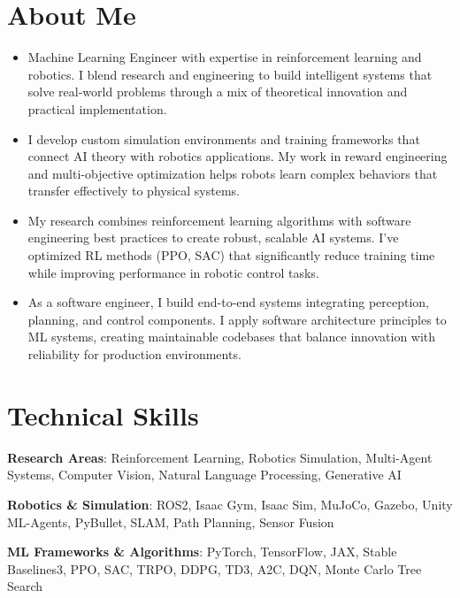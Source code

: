 \documentclass[a4paper,10pt]{article}
\begin{document}
\section{\textbf{About Me}}
\vspace{1mm}
\small{
\begin{itemize}
    \item Machine Learning Engineer with expertise in reinforcement learning and robotics. I blend research and engineering to build intelligent systems that solve real-world problems through a mix of theoretical innovation and practical implementation.
    
    \item I develop custom simulation environments and training frameworks that connect AI theory with robotics applications. My work in reward engineering and multi-objective optimization helps robots learn complex behaviors that transfer effectively to physical systems.
    
    \item My research combines reinforcement learning algorithms with software engineering best practices to create robust, scalable AI systems. I've optimized RL methods (PPO, SAC) that significantly reduce training time while improving performance in robotic control tasks.
    
    \item As a software engineer, I build end-to-end systems integrating perception, planning, and control components. I apply software architecture principles to ML systems, creating maintainable codebases that balance innovation with reliability for production environments.
\end{itemize}
}
\vspace{-2mm}
\section{\textbf{Technical Skills}}

\textbf{Research Areas}:  
Reinforcement Learning, Robotics Simulation, Multi-Agent Systems, Computer Vision, Natural Language Processing, Generative AI
\vspace{1mm}

\textbf{Robotics \& Simulation}:  
ROS2, Isaac Gym, Isaac Sim, MuJoCo, Gazebo, Unity ML-Agents, PyBullet, SLAM, Path Planning, Sensor Fusion
\vspace{1mm}

\textbf{ML Frameworks \& Algorithms}:  
PyTorch, TensorFlow, JAX, Stable Baselines3, PPO, SAC, TRPO, DDPG, TD3, A2C, DQN, Monte Carlo Tree Search
\vspace{1mm}
\end{document}
